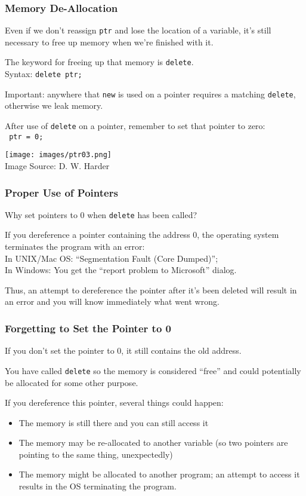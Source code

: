 \begin{frame}
\frametitle{Memory De-Allocation}

Even if we don't reassign \texttt{ptr} and lose the location of a variable, it's still necessary to free up memory when we're finished with it.

The keyword for freeing up that memory is \texttt{delete}.\\
\quad Syntax: \texttt{delete ptr;}

Important: anywhere that \texttt{new} is used on a pointer requires a matching \texttt{delete}, otherwise we leak memory.

After use of \texttt{delete} on a pointer, remember to set that pointer to zero:\\
\quad \texttt{ ptr = 0; }

\begin{center}
\texttt{[image: images/ptr03.png]}\\
{\tiny Image Source: D. W. Harder}
\end{center}


\end{frame}

\begin{frame}
\frametitle{Proper Use of Pointers}
Why set pointers to 0 when \texttt{delete} has been called?

If you dereference a pointer containing the address 0, the operating system terminates the program with an error:\\
\quad In UNIX/Mac OS: ``Segmentation Fault (Core Dumped)'';\\
\quad In Windows: You get the ``report problem to Microsoft'' dialog.

Thus, an attempt to dereference the pointer after it's been deleted will result in an error and you will know immediately what went wrong.



\end{frame}

\begin{frame}
\frametitle{Forgetting to Set the Pointer to 0}
If you don't set the pointer to 0, it still contains the old address.

You have called \texttt{delete} so the memory is considered ``free'' and could potentially be allocated for some other purpose.

If you dereference this pointer, several things could happen:
\begin{itemize}
	\item The memory is still there and you can still access it
	\item The memory may be re-allocated to another variable (so two pointers are pointing to the same thing, unexpectedly)
	\item The memory might be allocated to another program; an attempt to access it results in the OS terminating the program.
\end{itemize}

\end{frame}


